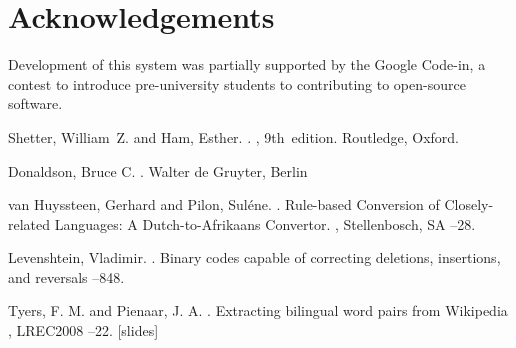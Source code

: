 \documentclass[11pt]{article}
\newcommand{\confname}{EAMT 2011}
\begin{document}
\section*{Acknowledgements}

Development of this system was partially supported by the Google Code-in,
a contest to introduce pre-university students to contributing to open-source
software.

% 

\begin{thebibliography}{}

Shetter, William~Z. and Ham, Esther.
.
, 9th~edition.
\newblock Routledge, Oxford.

Donaldson, Bruce C.
.
\newblock Walter de Gruyter, Berlin

van Huyssteen, Gerhard and Pilon, Suléne.
. 
\newblock Rule-based Conversion of Closely-related Languages: A Dutch-to-Afrikaans Convertor. 
, Stellenbosch, SA
--28.

Levenshtein, Vladimir.
. 
\newblock Binary codes capable of correcting deletions, insertions, and reversals
--848.

Tyers, F. M. and Pienaar, J. A.
. 
\newblock Extracting bilingual word pairs from Wikipedia
, LREC2008
--22. [slides]


\end{thebibliography}
\end{document}
